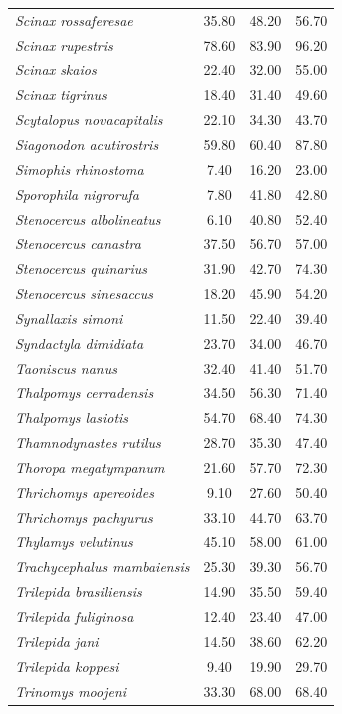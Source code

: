 \documentclass[12pt,openright,oneside,a4paper,english]{abntex2}
\begin{document}
\begin{longtable}{lccc}
	\textit{Scinax rossaferesae}&35.80 &48.20 &56.70 \\
	\textit{Scinax rupestris}&78.60 &83.90 &96.20 \\
	\textit{Scinax skaios}&22.40 &32.00 &55.00 \\
	\textit{Scinax tigrinus}&18.40 &31.40 &49.60 \\
	\textit{Scytalopus novacapitalis}&22.10 &34.30 &43.70 \\
	\textit{Siagonodon acutirostris}&59.80 &60.40 &87.80 \\
	\textit{Simophis rhinostoma}&7.40 &16.20 &23.00 \\
	\textit{Sporophila nigrorufa}&7.80 &41.80 &42.80 \\
	\textit{Stenocercus albolineatus}&6.10 &40.80 &52.40 \\
	\textit{Stenocercus canastra}&37.50 &56.70 &57.00 \\
	\textit{Stenocercus quinarius}&31.90 &42.70 &74.30 \\
	\textit{Stenocercus sinesaccus}&18.20 &45.90 &54.20 \\
	\textit{Synallaxis simoni}&11.50 &22.40 &39.40 \\
	\textit{Syndactyla dimidiata}&23.70 &34.00 &46.70 \\
	\textit{Taoniscus nanus}&32.40 &41.40 &51.70 \\
	\textit{Thalpomys cerradensis}&34.50 &56.30 &71.40 \\
	\textit{Thalpomys lasiotis}&54.70 &68.40 &74.30 \\
	\textit{Thamnodynastes rutilus}&28.70 &35.30 &47.40 \\
	\textit{Thoropa megatympanum}&21.60 &57.70 &72.30 \\
	\textit{Thrichomys apereoides}&9.10 &27.60 &50.40 \\
	\textit{Thrichomys pachyurus}&33.10 &44.70 &63.70 \\
	\textit{Thylamys velutinus}&45.10 &58.00 &61.00 \\
	\textit{Trachycephalus mambaiensis}&25.30 &39.30 &56.70 \\
	\textit{Trilepida brasiliensis}&14.90 &35.50 &59.40 \\
	\textit{Trilepida fuliginosa}&12.40 &23.40 &47.00 \\
	\textit{Trilepida jani}&14.50 &38.60 &62.20 \\
	\textit{Trilepida koppesi}&9.40 &19.90 &29.70 \\
	\textit{Trinomys moojeni}&33.30 &68.00 &68.40 \\

\end{longtable}
\end{document}
